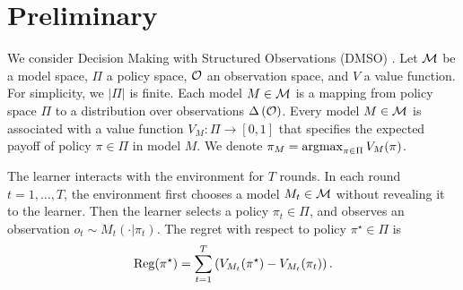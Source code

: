 \section{Preliminary}
\label{sec:pre}
We consider Decision Making with Structured Observations (DMSO) \citep{foster2021statistical}. Let 
$\mathcal{M}$ be a model space, $\Pi$ a policy space, $\mathcal{O}$ an observation space, and $V$ a value function. For simplicity, we $|\Pi|$ is finite. Each model $M \in \mathcal{M}$ is a mapping from policy space $\Pi$ to a distribution over observations $\Delta\left(\mathcal{O}\right)$. Every model $M\in\mathcal{M}$ is associated with a value function $V_M: \Pi\to [0,1]$ that specifies the expected payoff of policy $\pi\in\Pi$ in model $M$. We denote $\pi_M=\operatorname*{argmax}_{\pi\in\Pi}V_M(\pi)$.  %

The learner interacts with the environment for $T$ rounds. In each round $t =1,\ldots, T$, the environment first chooses a model $M_t \in \mathcal{M}$ without revealing it to the learner. Then the learner selects a policy $\pi_t \in \Pi$, and observes an observation $o_t \sim M_t(\cdot|\pi_t)$. The regret with respect to policy $\pi^\star\in\Pi$ is 
\begin{align*}
    \text{\rm Reg}(\pi^\star) = \sum_{t=1}^T \left(V_{M_t}(\pi^\star) - V_{M_t}(\pi_t)\right). 
\end{align*}



